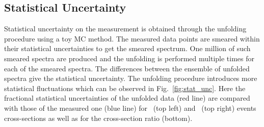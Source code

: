 \subsection{Statistical Uncertainty}
\label{sec:unfolding_stat}
Statistical uncertainty on the measurement is obtained through the unfolding procedure using a toy MC method. The measured data points are smeared within their statistical uncertainties to get the smeared spectrum. One million of such smeared spectra are produced and the unfolding is performed multiple times for each of the smeared spectra. The differences between the ensemble of unfolded spectra give the statistical uncertainty. The unfolding procedure introduces more statistical fluctuations which can be observed in Fig.~\ref{fig:stat_unc}. Here the fractional statistical uncertainties of the unfolded data (red line) are compared with those of the measured one (blue line) for \njt~(top left) and \njth~(top right) events cross-sections as well as for the cross-section ratio \ratio (bottom). 

